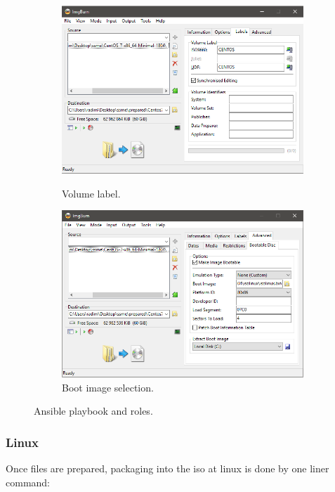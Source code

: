 \documentclass[
  printed, %
  table,   %
  nolof,     %
  nolot,     %
           oneside, color
]{fithesis3}
\renewcommand{\texttt}[1]{%
  \begingroup
  \ttfamily
  \begingroup\lccode`~=`/\lowercase{\endgroup\def~}{/\discretionary{}{}{}}%
  \begingroup\lccode`~=`[\lowercase{\endgroup\def~}{[\discretionary{}{}{}}%
  \begingroup\lccode`~=`.\lowercase{\endgroup\def~}{.\discretionary{}{}{}}%
  \catcode`/=\active\catcode`[=\active\catcode`.=\active
  \scantokens{#1\noexpand}%
  \endgroup
}
\begin{document}
\begin{figure}[H]
\begin{subfigure}{.5\textwidth}
\begin{center}

 \includegraphics[trim={9.1cm 3cm 0.4cm 3cm},clip,width=.8\textwidth]{Screenshot_16.png}
    \caption{Volume label.}
    \label{pic:withoutresdrawable}
 \label{fig:sub1}\end{center}
\end{subfigure}%
\begin{subfigure}{.5\textwidth}
\begin{center}

 \includegraphics[trim={9.1cm 3cm 0.4cm 3cm},clip,width=.8\textwidth]{Screenshot_17.png}
    \caption{Boot image selection.}
\end{center}
\end{subfigure}
\label{fig:test}\caption{Ansible playbook and roles.}
\end{figure}


\subsubsection{Linux}
Once files are prepared, packaging into the iso at linux is done by one liner command:
\end{document}
